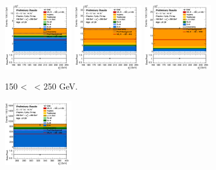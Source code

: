 \begin{figure}[h!]
    \centering
    \begin{subfigure}[b]{\textwidth}
        \centering
        \includegraphics[width=0.32\textwidth]{Images/VH/Own_fit/postfit_VHbb/Region_distpTV_BMax250_BMin150_DCRHigh_J2_TTypebb_T2_L0_Y6051_GlobalFit_conditionnal_mu1.png}
        \includegraphics[width=0.32\textwidth]{Images/VH/Own_fit/postfit_VHbb/Region_distpTV_BMax250_BMin150_DCRHigh_J3_TTypebb_T2_L0_Y6051_GlobalFit_conditionnal_mu1.png}
        \includegraphics[width=0.32\textwidth]{Images/VH/Own_fit/postfit_VHbb/Region_distpTV_BMax250_BMin150_DCRHigh_J4_TTypebb_T2_L0_Y6051_GlobalFit_conditionnal_mu1.png}
        \caption{150 < \ptv\ < 250 GeV.}
        \label{fig:plots_VHbb_OL_150_CRH}
    \end{subfigure}
    \begin{subfigure}[b]{\textwidth}
        \centering
        \includegraphics[width=0.32\textwidth]{Images/VH/Own_fit/postfit_VHbb/Region_distpTV_BMax400_BMin250_DCRHigh_J2_TTypebb_T2_L0_Y6051_GlobalFit_conditionnal_mu1.png}

\end{subfigure}
\end{figure}
